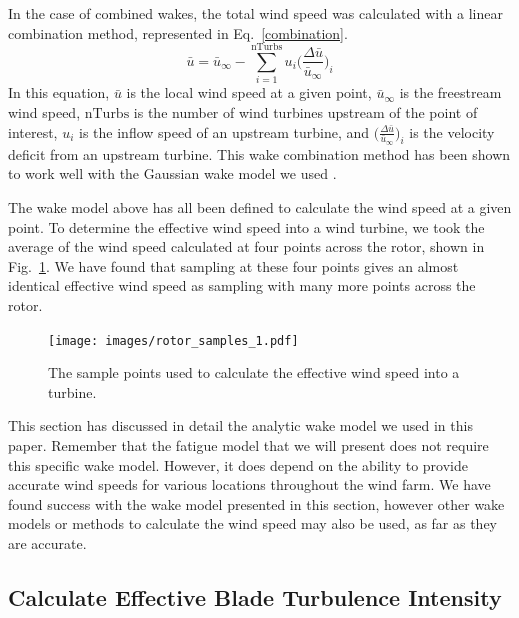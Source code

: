 \documentclass[11pt,letterpaper]{article}
\begin{document}
In the case of combined wakes, the total wind speed was calculated with a linear combination method, represented in Eq.~\ref{combination}.
%
\begin{equation}
    \label{combination}
    \bar{u} = \bar{u}_\infty - \sum_{i=1}^\text{nTurbs} u_i \Big(\frac{\Delta\bar{u}}{\bar{u}_{\infty}}\Big)_i
\end{equation}
% 
In this equation, $\bar{u}$ is the local wind speed at a given point, $\bar{u}_\infty$ is the freestream wind speed, $\text{nTurbs}$ is the number of wind turbines upstream of the point of interest, $u_i$ is the inflow speed of an upstream turbine, and $\Big(\frac{\Delta\bar{u}}{\bar{u}_{\infty}}\Big)_i$ is the velocity deficit from an upstream turbine. This wake combination method has been shown to work well with the Gaussian wake model we used \cite{niayifar2016analytical}.

The wake model above has all been defined to calculate the wind speed at a given point. To determine the effective wind speed into a wind turbine, we took the average of the wind speed calculated at four points across the rotor, shown in Fig.~\ref{speed_samples}. We have found that sampling at these four points gives an almost identical effective wind speed as sampling with many more points across the rotor.
% 
\begin{figure}
    \centering
    \hspace*{0.7cm} 
    \texttt{[image: images/rotor\_samples\_1.pdf]}
    \caption{The sample points used to calculate the effective wind speed into a turbine.}
    \label{speed_samples}
\end{figure}

This section has discussed in detail the analytic wake model we used in this paper. Remember that the fatigue model that we will present does not require this specific wake model. However, it does depend on the ability to provide accurate wind speeds for various locations throughout the wind farm. We have found success with the wake model presented in this section, however other wake models or methods to calculate the wind speed may also be used, as far as they are accurate. 

\subsection{Calculate Effective Blade Turbulence Intensity}
\label{sec:TI}
\end{document}
